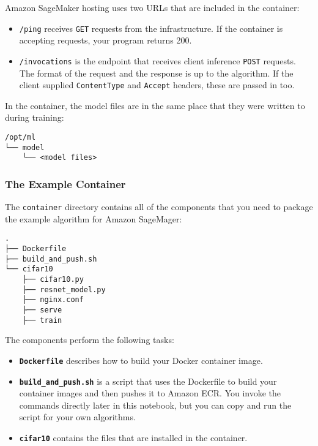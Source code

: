 \documentclass[11pt]{article}
\providecommand{\tightlist}{%
      \setlength{\itemsep}{0pt}\setlength{\parskip}{0pt}}
\begin{document}
Amazon SageMaker hosting uses two URLs that are included in the
container:

\begin{itemize}
\tightlist
\item
  \texttt{/ping} receives \texttt{GET} requests from the infrastructure.
  If the container is accepting requests, your program returns 200.
\item
  \texttt{/invocations} is the endpoint that receives client inference
  \texttt{POST} requests. The format of the request and the response is
  up to the algorithm. If the client supplied \texttt{ContentType} and
  \texttt{Accept} headers, these are passed in too.
\end{itemize}

In the container, the model files are in the same place that they were
written to during training:

\begin{verbatim}
/opt/ml
└── model
    └── <model files>
\end{verbatim}

    \subsubsection{The Example Container}\label{the-example-container}

The \texttt{container} directory contains all of the components that you
need to package the example algorithm for Amazon SageMager:

\begin{verbatim}
.
├── Dockerfile
├── build_and_push.sh
└── cifar10
    ├── cifar10.py
    ├── resnet_model.py
    ├── nginx.conf
    ├── serve
    ├── train
\end{verbatim}

The components perform the following tasks:

\begin{itemize}
\tightlist
\item
  \textbf{\texttt{Dockerfile}} describes how to build your Docker
  container image.
\item
  \textbf{\texttt{build\_and\_push.sh}} is a script that uses the
  Dockerfile to build your container images and then pushes it to Amazon
  ECR. You invoke the commands directly later in this notebook, but you
  can copy and run the script for your own algorithms.
\item
  \textbf{\texttt{cifar10}} contains the files that are installed in the
  container.
\end{itemize}
\end{document}
